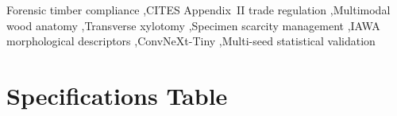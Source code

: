 \documentclass[a4paper,fleqn,12pt]{cas-sc}
\begin{document}
\begin{keywords}
Forensic timber compliance \sep CITES Appendix~II trade regulation \sep Multimodal wood anatomy \sep Transverse xylotomy \sep Specimen scarcity management \sep IAWA morphological descriptors \sep ConvNeXt-Tiny \sep Multi-seed statistical validation
\end{keywords}

\maketitle

\section*{Specifications Table}

\noindent
\small
\setlength{\tabcolsep}{5pt}
\renewcommand{\arraystretch}{1.12}
\end{document}
